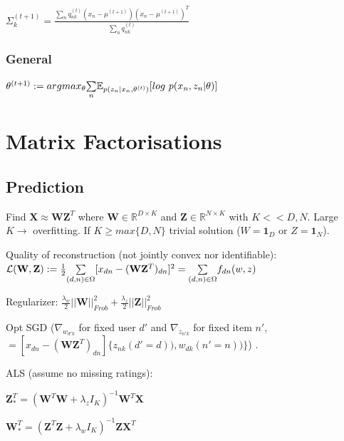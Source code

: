 $\Sigma_k^{(t+1)} = \frac{\underset{n}{\sum} q_{nk}^{(t)}(x_n - \mu^{(t+1)})(x_n - \mu^{(t+1)})^T}{\underset{n}{\sum} q_{nk}^{(t)}}$
\newline

\subsubsection{General}
$\theta^{(t+1)} := argmax_{\theta} \underset{n}{\sum} \mathbb{E}_{p(z_n|x_n,\theta^{(t)})}\newline[log\,\, p(x_n,z_n|\theta)]$\newline

\section{Matrix Factorisations}
\subsection{Prediction}
Find $\mathbf{X} \approx \mathbf{W}\mathbf{Z}^T$ where $\mathbf{W} \in \mathbb{R}^{D\times K}$ and $\mathbf{Z} \in \mathbb{R}^{N\times K}$ with $K << D,N$. Large $K\rightarrow$ overfitting. If $K \ge max\{D,N\}$ trivial solution ($W=\mathbf{1}_D$ or $Z=\mathbf{1}_N$).

Quality of reconstruction (not jointly convex nor identifiable):\newline $\mathcal{L}(\mathbf{W}, \mathbf{Z}) := \frac{1}{2} \underset{(d,n)\in \Omega}{\sum} [x_{dn} - (\mathbf{W}\mathbf{Z}^T)_{dn}]^2 \newline= \underset{(d,n)\in \Omega}{\sum} f_{dn}(w,z)$

Regularizer: $\frac{\lambda_w}{2} ||\mathbf{W}||^2_{Frob} + \frac{\lambda_z}{2} ||\mathbf{Z}||^2_{Frob}$

Opt SGD ($\nabla_{w_{d'k}}$ for fixed user $d'$ and $\nabla_{z_{n'k}}$ for fixed item $n'$, $=[x_{dn}-(\mathbf{W}\mathbf{Z}^T)_{dn}]\{z_{nk} (d'=d)), w_{dk} (n'=n))\} $) . 

ALS (assume no missing ratings):

$\mathbf{Z}^T_* = (\mathbf{W}^T\mathbf{W} + \lambda_z I_K)^{-1} \mathbf{W}^T \mathbf{X}$

$\mathbf{W}^T_* = (\mathbf{Z}^T\mathbf{Z} + \lambda_w I_K)^{-1} \mathbf{Z} \mathbf{X}^T$

